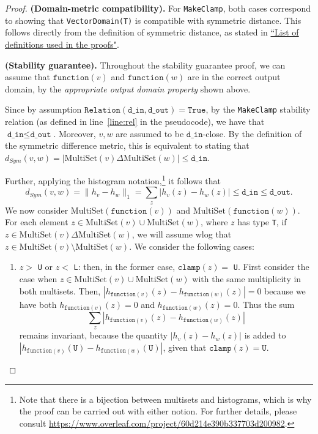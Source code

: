 \documentclass[11pt,a4paper]{article}
\theoremstyle{definition}
\newcommand{\MultiSet}{\mathrm{MultiSet}}
\newcommand{\din}{\texttt{d\_in}}
\newcommand{\dout}{\texttt{d\_out}}
\newcommand{\Relation}{\texttt{Relation}}
\newcommand{\True}{\texttt{True}}
\newcommand{\clamp}{\texttt{clamp}}
\newcommand{\function}{\texttt{function}}
\begin{document}
\begin{proof}
\smallskip
\textbf{(Domain-metric compatibility).}  For \texttt{MakeClamp}, both cases correspond to showing that \texttt{VectorDomain(T)} is compatible with symmetric distance. This follows directly from the definition of symmetric distance, as stated in \href{https://www.overleaf.com/project/60d214e390b337703d200982}{``List of definitions used in the proofs"}.

\smallskip
\textbf{(Stability guarantee).} Throughout the stability guarantee proof, we can assume that $\function(v)$ and $\function(w)$ are in the correct output domain, by the \textit{appropriate output domain property} shown above. 

Since by assumption $\Relation(\din, \dout) = \True$, by the \texttt{MakeClamp} stability relation (as defined in line~\ref{line:rel} in the pseudocode), we have that $\din \leq \dout$. Moreover, $v, w$ are assumed to be $\din$-close. By the definition of the symmetric difference metric, this is equivalent to stating that $d_{Sym}(v, w) = |\MultiSet(v) \Delta \MultiSet(w)| \leq \din$.

Further, applying the histogram notation,\footnote{Note that there is a bijection between multisets and histograms, which is why the proof can be carried out with either notion. For further details, please consult \url{https://www.overleaf.com/project/60d214e390b337703d200982}.}  it follows that
\[
d_{Sym}(v, w) = \lVert h_{v} - h_{w}\rVert_1 = \sum_z |h_v(z) - h_w(z)| \leq \din \leq \dout.
\]
We now consider $\MultiSet(\function(v))$ and $\MultiSet(\function(w))$.
For each element $z \in \MultiSet(v) \cup \MultiSet(w)$, where $z$ has type \texttt{T}, if $z \in \MultiSet(v) \Delta \MultiSet(w)$, we will assume wlog that $z \in \MultiSet(v) \setminus \MultiSet(w)$. We consider the following cases:

\begin{enumerate}
    \item $z >$ \texttt{U} or $z <$ \texttt{L}: then, in the former case, $\clamp(z) =$ \texttt{U}. First consider the case when $z \in \MultiSet(v) \cup \MultiSet(w)$ with the same multiplicity in both multisets. Then, $|h_{\function(v)}(z) - h_{\function(w)}(z)| = 0$ because we have both $h_{\function(v)}(z) = 0$ and $h_{\function(w)}(z) = 0$. Thus the sum
    \[
    \sum_z |h_{\function(v)}(z) - h_{\function(w)}(z)|
    \]
    remains invariant, because the quantity $|h_{v}(z) - h_{w}(z)|$ is added to $|h_{\function(v)}(\texttt{U}) - h_{\function(w)}(\texttt{U})|$, given that $\clamp(z) = \texttt{U}$. 
    

\end{enumerate}
\end{proof}
\end{document}
